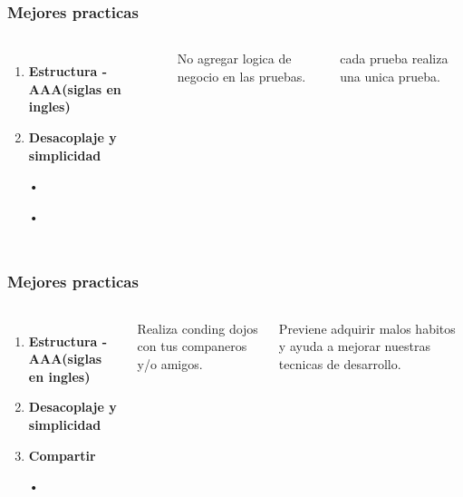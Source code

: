 \documentclass{beamer}
\begin{document}
\begin{frame}
\frametitle{Mejores practicas}
\begin{columns}[c] %

\begin{enumerate}
\item \textbf{Estructura - AAA(siglas en ingles)}
\item \textbf{Desacoplaje y simplicidad}
\item[•]	
\item[•]	

\end{enumerate}

No agregar logica de negocio en las pruebas.

cada prueba realiza una unica prueba.
\end{columns}
\end{frame}

\begin{frame}
\frametitle{Mejores practicas}
\begin{columns}[c] %

\begin{enumerate}
\item \textbf{Estructura - AAA(siglas en ingles)}
\item \textbf{Desacoplaje y simplicidad}
\item \textbf{Compartir}
\item[•]	

\end{enumerate}

Realiza conding dojos con tus companeros y/o amigos.

Previene adquirir malos habitos y ayuda a mejorar nuestras tecnicas de desarrollo.
\end{columns}
\end{frame}
\end{document}
